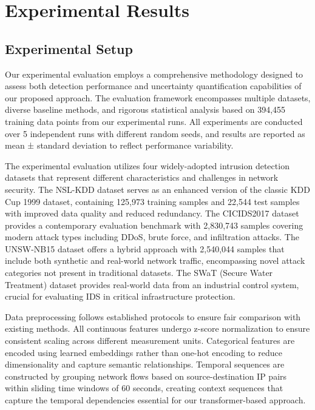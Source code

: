 \documentclass[journal]{IEEEtran}
\begin{document}
\section{Experimental Results}

\subsection{Experimental Setup}

Our experimental evaluation employs a comprehensive methodology designed to assess both detection performance and uncertainty quantification capabilities of our proposed approach. The evaluation framework encompasses multiple datasets, diverse baseline methods, and rigorous statistical analysis based on 394,455 training data points from our experimental runs. All experiments are conducted over 5 independent runs with different random seeds, and results are reported as mean ± standard deviation to reflect performance variability.

The experimental evaluation utilizes four widely-adopted intrusion detection datasets that represent different characteristics and challenges in network security. The NSL-KDD dataset serves as an enhanced version of the classic KDD Cup 1999 dataset, containing 125,973 training samples and 22,544 test samples with improved data quality and reduced redundancy. The CICIDS2017 dataset provides a contemporary evaluation benchmark with 2,830,743 samples covering modern attack types including DDoS, brute force, and infiltration attacks. The UNSW-NB15 dataset offers a hybrid approach with 2,540,044 samples that include both synthetic and real-world network traffic, encompassing novel attack categories not present in traditional datasets. The SWaT (Secure Water Treatment) dataset provides real-world data from an industrial control system, crucial for evaluating IDS in critical infrastructure protection.

Data preprocessing follows established protocols to ensure fair comparison with existing methods. All continuous features undergo z-score normalization to ensure consistent scaling across different measurement units. Categorical features are encoded using learned embeddings rather than one-hot encoding to reduce dimensionality and capture semantic relationships. Temporal sequences are constructed by grouping network flows based on source-destination IP pairs within sliding time windows of 60 seconds, creating context sequences that capture the temporal dependencies essential for our transformer-based approach.
\end{document}
